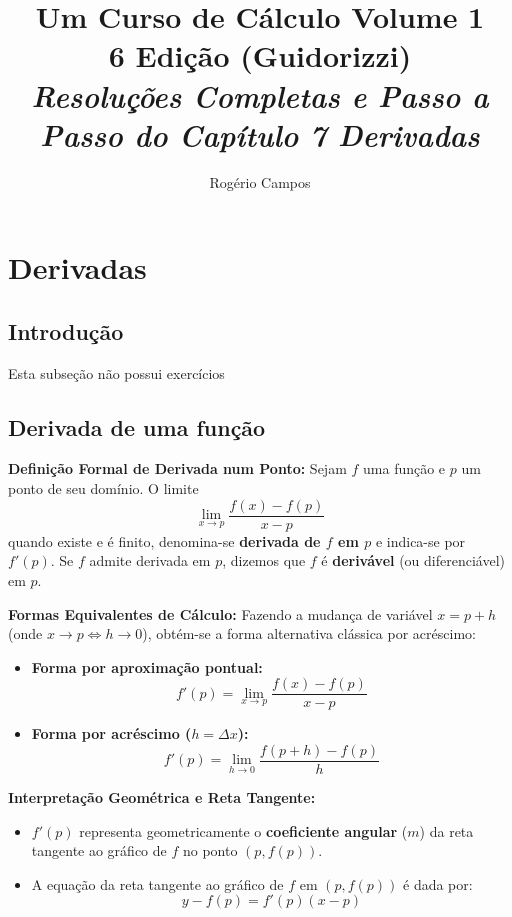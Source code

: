 \documentclass[12pt,a4paper]{article}
\title{
    \Huge \textbf{Um Curso de Cálculo Volume 1} \\
    \vspace{0.3cm}
    \Large 6\textordfeminine{} Edição (Guidorizzi) \\
    \vspace{0.5cm}
    \large \textit{Resoluções Completas e Passo a Passo do Capítulo 7 Derivadas}
}
\author{Rogério Campos}
\begin{document}
\maketitle
\newpage

\tableofcontents
\newpage

\setcounter{section}{6}
\setcounter{subsection}{0}

\section{Derivadas}

\subsection{Introdução}
Esta subseção não possui exercícios

\subsection{Derivada de uma função}

\begin{recursosbox}
\textbf{Definição Formal de Derivada num Ponto:}
Sejam $f$ uma função e $p$ um ponto de seu domínio. O limite
\[
\lim_{x \to p} \frac{f(x) - f(p)}{x - p}
\]
quando existe e é finito, denomina-se \textbf{derivada de $f$ em $p$} e indica-se por $f'(p)$. Se $f$ admite derivada em $p$, dizemos que $f$ é \textbf{derivável} (ou diferenciável) em $p$.

\vspace{0.2cm}
\textbf{Formas Equivalentes de Cálculo:}
Fazendo a mudança de variável $x = p + h$ (onde $x \to p \iff h \to 0$), obtém-se a forma alternativa clássica por acréscimo:
\begin{itemize}[noitemsep, topsep=2pt]
    \item \textbf{Forma por aproximação pontual:}
    \[
    f'(p) = \lim_{x \to p} \frac{f(x) - f(p)}{x - p}
    \]
    \item \textbf{Forma por acréscimo ($h = \Delta x$):}
    \[
    f'(p) = \lim_{h \to 0} \frac{f(p + h) - f(p)}{h}
    \]
\end{itemize}

\vspace{0.2cm}
\textbf{Interpretação Geométrica e Reta Tangente:}
\begin{itemize}[noitemsep, topsep=2pt]
    \item $f'(p)$ representa geometricamente o \textbf{coeficiente angular} ($m$) da reta tangente ao gráfico de $f$ no ponto $(p, f(p))$.
    \item A equação da reta tangente ao gráfico de $f$ em $(p, f(p))$ é dada por:
    \[
    y - f(p) = f'(p)(x - p)
    \]
\end{itemize}
\end{recursosbox}
\end{document}
